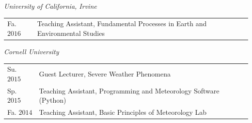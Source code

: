 \documentclass[margin,line,palatino,courier,10pt]{res}
\begin{document}
\begin{resume}
\textit{University of California, Irvine}
\vspace*{0.05in}\\
\begin{tabular}{@{}p{0.8in}p{4in}}
Fa. $2016$ & Teaching Assistant, Fundamental Processes in Earth and Environmental Studies\\
\end{tabular}

\textit{Cornell University}
\vspace*{0.05in}\\
\begin{tabular}{@{}p{0.8in}p{4in}}
Su. $2015$ & Guest Lecturer, Severe Weather Phenomena\\
Sp. $2015$ & Teaching Assistant, Programming and Meteorology Software (Python)\\
Fa. $2014$ & Teaching Assistant, Basic Principles of Meteorology Lab\\
\end{tabular}


\end{resume}
\end{document}
